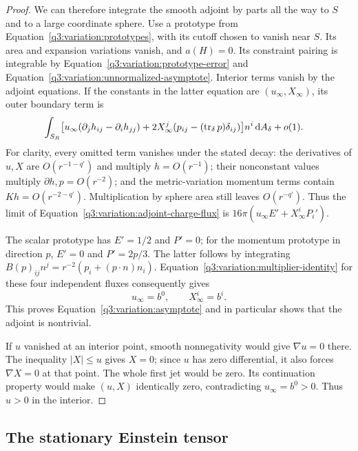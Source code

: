 \begin{proof}
We can therefore integrate the smooth adjoint by parts all the way
to $S$ and to a large coordinate sphere.  Use a prototype from
Equation~\eqref{q3:variation:prototypes}, with its cutoff chosen to
vanish near $S$.  Its area and expansion variations vanish, and
$a(H)=0$.  Its constraint pairing is integrable by
Equation~\eqref{q3:variation:prototype-error} and
Equation~\eqref{q3:variation:unnormalized-asymptote}.  Interior terms
vanish by the adjoint equations.  If the constants in the latter
equation are $(u_\infty,X_\infty)$, its outer boundary term is
\begin{equation}
 \begin{split}
 \int_{S_R}\bigl[&u_\infty(\partial_jh_{ij}-\partial_i h_{jj})
       +2X_\infty^j(p_{ij}-(\operatorname{tr}_\delta p)\delta_{ij})\bigr]
          n^i\,\mathrm d A_\delta+o(1).
 \end{split}
 \label{q3:variation:adjoint-charge-flux}
\end{equation}
For clarity, every omitted term vanishes under the stated decay:
the derivatives of $u,X$ are $O(r^{-1-q'})$ and multiply
$h=O(r^{-1})$; their nonconstant values multiply
$\partial h,p=O(r^{-2})$; and the metric-variation momentum terms
contain $Kh=O(r^{-2-q'})$.  Multiplication by sphere area still
leaves $O(r^{-q'})$.  Thus the limit of
Equation~\eqref{q3:variation:adjoint-charge-flux} is
$16\pi(u_\infty E'+X_\infty^iP_i')$.

The scalar prototype has $E'=1/2$ and $P'=0$; for the momentum
prototype in direction $p$, $E'=0$ and $P'=2p/3$.  The latter follows
by integrating
$B(p)_{ij}n^j=r^{-2}(p_i+(p\cdot n)n_i)$.
Equation~\eqref{q3:variation:multiplier-identity} for these four
independent fluxes consequently gives
\[
 u_\infty=b^0,\qquad X_\infty^i=b^i.
\]
This proves Equation~\eqref{q3:variation:asymptote} and in particular
shows that the adjoint is nontrivial.

If $u$ vanished at an interior point, smooth nonnegativity would
give $\nabla u=0$ there.  The inequality $|X|\le u$ gives $X=0$;
since $u$ has zero differential, it also forces $\nabla X=0$ at
that point.  The whole first jet would be zero.  Its continuation
property would make $(u,X)$ identically zero, contradicting
$u_\infty=b^0>0$.  Thus $u>0$ in the interior.
\end{proof}

\subsection{The stationary Einstein tensor}
\label{q3:variation:stationary-subsection}

